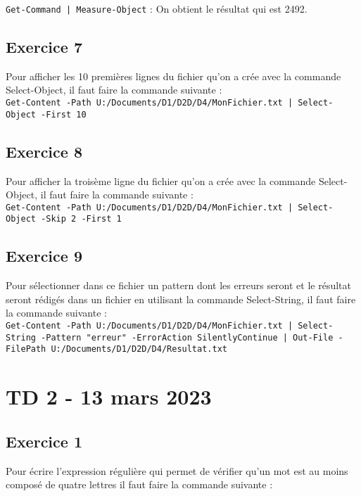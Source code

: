 \documentclass[12pt, a4paper]{article}
\begin{document}
\texttt{Get-Command | Measure-Object} : On obtient le résultat qui est 2492.\\

\subsection{Exercice 7}
Pour afficher les 10 premières lignes du fichier qu'on a crée avec la commande 
Select-Object, il faut faire la commande suivante :\\

\texttt{Get-Content -Path U:/Documents/D1/D2D/D4/MonFichier.txt | Select-Object -First 10}\\

\subsection{Exercice 8}
Pour afficher la troisème ligne du fichier qu'on a crée avec la commande Select-Object,
il faut faire la commande suivante :\\

\texttt{Get-Content -Path U:/Documents/D1/D2D/D4/MonFichier.txt | Select-Object -Skip 2 -First 1}\\

\subsection{Exercice 9}
Pour sélectionner dans ce fichier un pattern dont les erreurs seront et le résultat 
seront rédigés dans un fichier en utilisant la commande Select-String, il faut faire
la commande suivante :\\

\texttt{Get-Content -Path U:/Documents/D1/D2D/D4/MonFichier.txt | Select-String -Pattern "erreur" -ErrorAction SilentlyContinue | Out-File -FilePath U:/Documents/D1/D2D/D4/Resultat.txt}\\


\section{TD 2 - 13 mars 2023}
\subsection{Exercice 1}
Pour écrire l’expression régulière qui permet de vérifier qu’un mot est au moins composé de quatre lettres il 
faut faire la commande suivante :\\
\end{document}
